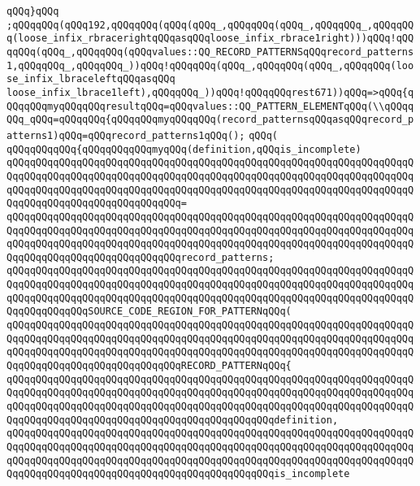 \verb|qQQq}qQQq|\newline
\verb|;qQQqqQQq(qQQq192,qQQqqQQq(qQQq(qQQq_,qQQqqQQq(qQQq_,qQQqqQQq_,qQQqqQQq(loose_infix_rbracerightqQQqasqQQqloose_infix_rbrace1right)))qQQq!qQQqqQQq(qQQq_,qQQqqQQq(qQQqvalues::QQ_RECORD_PATTERNSqQQqrecord_patterns1,qQQqqQQq_,qQQqqQQq_))qQQq!qQQqqQQq(qQQq_,qQQqqQQq(qQQq_,qQQqqQQq(loose_infix_lbraceleftqQQqasqQQq|\newline
\verb|loose_infix_lbrace1left),qQQqqQQq_))qQQq!qQQqqQQqrest671))qQQq=>qQQq{qQQqqQQqmyqQQqqQQqresultqQQq=qQQqvalues::QQ_PATTERN_ELEMENTqQQq(\\qQQqqQQq_qQQq=qQQqqQQq{qQQqqQQqmyqQQqqQQq(record_patternsqQQqasqQQqrecord_patterns1)qQQq=qQQqrecord_patterns1qQQq();|\newline
\verb|qQQq(|\newline
\verb|qQQqqQQqqQQq{qQQqqQQqqQQqmyqQQq(definition,qQQqis_incomplete)|\newline
\verb|qQQqqQQqqQQqqQQqqQQqqQQqqQQqqQQqqQQqqQQqqQQqqQQqqQQqqQQqqQQqqQQqqQQqqQQqqQQqqQQqqQQqqQQqqQQqqQQqqQQqqQQqqQQqqQQqqQQqqQQqqQQqqQQqqQQqqQQqqQQqqQQqqQQqqQQqqQQqqQQqqQQqqQQqqQQqqQQqqQQqqQQqqQQqqQQqqQQqqQQqqQQqqQQqqQQqqQQqqQQqqQQqqQQqqQQqqQQqqQQq=|\newline
\verb|qQQqqQQqqQQqqQQqqQQqqQQqqQQqqQQqqQQqqQQqqQQqqQQqqQQqqQQqqQQqqQQqqQQqqQQqqQQqqQQqqQQqqQQqqQQqqQQqqQQqqQQqqQQqqQQqqQQqqQQqqQQqqQQqqQQqqQQqqQQqqQQqqQQqqQQqqQQqqQQqqQQqqQQqqQQqqQQqqQQqqQQqqQQqqQQqqQQqqQQqqQQqqQQqqQQqqQQqqQQqqQQqqQQqqQQqqQQqqQQqrecord_patterns;|\newline
\newline
\verb|qQQqqQQqqQQqqQQqqQQqqQQqqQQqqQQqqQQqqQQqqQQqqQQqqQQqqQQqqQQqqQQqqQQqqQQqqQQqqQQqqQQqqQQqqQQqqQQqqQQqqQQqqQQqqQQqqQQqqQQqqQQqqQQqqQQqqQQqqQQqqQQqqQQqqQQqqQQqqQQqqQQqqQQqqQQqqQQqqQQqqQQqqQQqqQQqqQQqqQQqqQQqqQQqqQQqqQQqqQQqqQQqSOURCE_CODE_REGION_FOR_PATTERNqQQq(|\newline
\verb|qQQqqQQqqQQqqQQqqQQqqQQqqQQqqQQqqQQqqQQqqQQqqQQqqQQqqQQqqQQqqQQqqQQqqQQqqQQqqQQqqQQqqQQqqQQqqQQqqQQqqQQqqQQqqQQqqQQqqQQqqQQqqQQqqQQqqQQqqQQqqQQqqQQqqQQqqQQqqQQqqQQqqQQqqQQqqQQqqQQqqQQqqQQqqQQqqQQqqQQqqQQqqQQqqQQqqQQqqQQqqQQqqQQqqQQqqQQqqQQqRECORD_PATTERNqQQq{|\newline
\verb|qQQqqQQqqQQqqQQqqQQqqQQqqQQqqQQqqQQqqQQqqQQqqQQqqQQqqQQqqQQqqQQqqQQqqQQqqQQqqQQqqQQqqQQqqQQqqQQqqQQqqQQqqQQqqQQqqQQqqQQqqQQqqQQqqQQqqQQqqQQqqQQqqQQqqQQqqQQqqQQqqQQqqQQqqQQqqQQqqQQqqQQqqQQqqQQqqQQqqQQqqQQqqQQqqQQqqQQqqQQqqQQqqQQqqQQqqQQqqQQqqQQqqQQqqQQqqQQqdefinition,|\newline
\verb|qQQqqQQqqQQqqQQqqQQqqQQqqQQqqQQqqQQqqQQqqQQqqQQqqQQqqQQqqQQqqQQqqQQqqQQqqQQqqQQqqQQqqQQqqQQqqQQqqQQqqQQqqQQqqQQqqQQqqQQqqQQqqQQqqQQqqQQqqQQqqQQqqQQqqQQqqQQqqQQqqQQqqQQqqQQqqQQqqQQqqQQqqQQqqQQqqQQqqQQqqQQqqQQqqQQqqQQqqQQqqQQqqQQqqQQqqQQqqQQqqQQqqQQqqQQqqQQqis_incomplete|\newline
